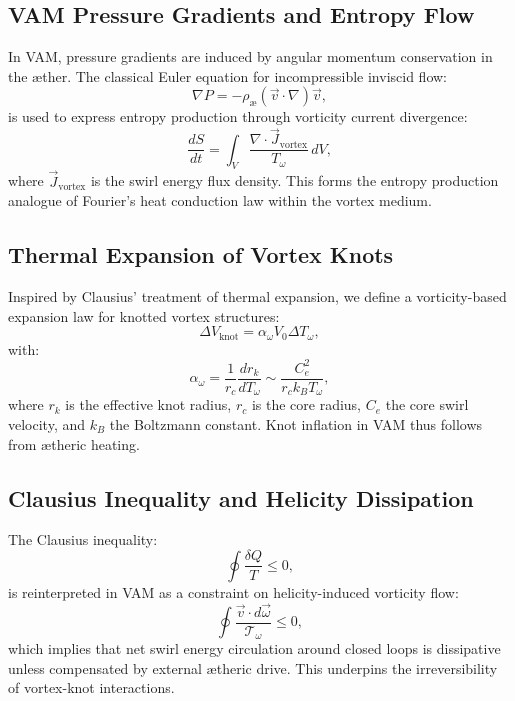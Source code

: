 \subsection*{VAM Pressure Gradients and Entropy Flow}

In VAM, pressure gradients are induced by angular momentum conservation in the æther. The classical Euler equation for incompressible inviscid flow:
\begin{equation}
    \nabla P = -\rho_\text{\ae} (\vec{v} \cdot \nabla) \vec{v},
\end{equation}
is used to express entropy production through vorticity current divergence:
\begin{equation}
    \frac{dS}{dt} = \int_V \frac{\nabla \cdot \vec{J}_\text{vortex}}{T_\omega} \, dV,
\end{equation}
where $\vec{J}_\text{vortex}$ is the swirl energy flux density. This forms the entropy production analogue of Fourier's heat conduction law within the vortex medium.

\subsection*{Thermal Expansion of Vortex Knots}

Inspired by Clausius' treatment of thermal expansion, we define a vorticity-based expansion law for knotted vortex structures:
\begin{equation}
    \Delta V_\text{knot} = \alpha_\omega V_0 \Delta T_\omega,
\end{equation}
with:
\begin{equation}
    \alpha_\omega = \frac{1}{r_c} \frac{d r_k}{d T_\omega} \sim \frac{C_e^2}{r_c k_B T_\omega},
\end{equation}
where $r_k$ is the effective knot radius, $r_c$ is the core radius, $C_e$ the core swirl velocity, and $k_B$ the Boltzmann constant. Knot inflation in VAM thus follows from ætheric heating.

\subsection*{Clausius Inequality and Helicity Dissipation}

The Clausius inequality:
\begin{equation}
    \oint \frac{\delta Q}{T} \leq 0,
\end{equation}
is reinterpreted in VAM as a constraint on helicity-induced vorticity flow:
\begin{equation}
    \oint \frac{\vec{v} \cdot d\vec{\omega}}{\mathcal{T}_\omega} \leq 0,
\end{equation}
which implies that net swirl energy circulation around closed loops is dissipative unless compensated by external ætheric drive. This underpins the irreversibility of vortex-knot interactions.

